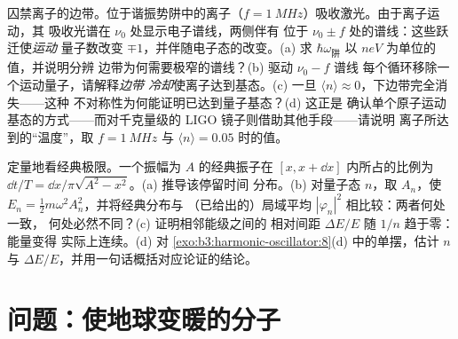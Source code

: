 \begin{exercise}[$\star\star\star$]\label{exo:b3:harmonic-oscillator:11}
囚禁离子的边带。位于谐振势阱中的离子（$f =
\qty{1}{MHz}$）吸收激光。由于离子运动，其
吸收光谱在 $\nu_0$ 处显示电子谱线，两侧伴有
位于 $\nu_0 \pm f$ 处的谱线：这些跃迁使\emph{运动}
量子数改变 $\mp1$，并伴随电子态的改变。(a) 求
$\hbar\omega_{\text{阱}}$ 以 $\unit{neV}$ 为单位的值，并说明分辨
边带为何需要极窄的谱线？(b) 驱动 $\nu_0 - f$ 谱线
每个循环移除一个运动量子，请解释\emph{边带
冷却}使离子达到基态。(c) 一旦 $\langle n\rangle \approx
0$，下边带完全消失——这种
不对称性为何能证明已达到量子基态？(d) 这正是
确认单个原子运动基态的方式——而对千克量级的
LIGO 镜子则借助其他手段——请说明
离子所达到的“温度”，取 $f = \qty{1}{MHz}$ 与
$\langle n\rangle = 0.05$ 时的值。
\end{exercise}

\begin{exercise}[$\star\star\star$]\label{exo:b3:harmonic-oscillator:12}
定量地看经典极限。一个振幅为
$A$ 的经典振子在 $[x, x + \dd x]$ 内所占的比例为 $\dd
t/T = \dd x/\pi\sqrt{A^2 - x^2}$。(a) 推导该停留时间
分布。(b) 对量子态 $n$，取 $A_n$，使 $E_n =
\tfrac12 m\omega^2A_n^2$，并将经典分布与
（已给出的）局域平均 $|\varphi_n|^2$ 相比较：两者何处一致，
何处必然不同？(c) 证明相邻能级之间的
相对间距 $\Delta E/E$ 随 $1/n$ 趋于零：能量变得
实际上连续。(d) 对
\cref{exo:b3:harmonic-oscillator:8}(d) 中的单摆，估计 $n$ 与 $\Delta
E/E$，并用一句话概括对应论证的结论。
\end{exercise}

\section{问题：使地球变暖的分子}

